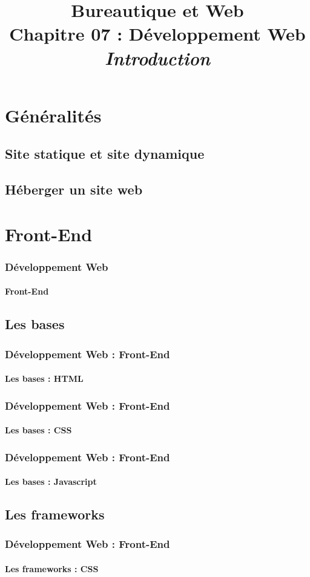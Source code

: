 \documentclass[xcolor=table]{beamer}
\title[BWEB : 08- Web (HTML)] %
{Bureautique et Web \\Chapitre 07 : Développement Web\\ \slshape\small  Introduction}
\begin{document}
	
\section{Généralités}

\subsection{Site statique et site dynamique}

\subsection{Héberger un site web}



\section{Front-End}

\begin{frame}
\frametitle{Développement Web}
\framesubtitle{Front-End}


\end{frame}

\subsection{Les bases}

\begin{frame}
\frametitle{Développement Web : Front-End}
\framesubtitle{Les bases : HTML}

\end{frame}

\begin{frame}
\frametitle{Développement Web : Front-End}
\framesubtitle{Les bases : CSS}

\end{frame}

\begin{frame}
\frametitle{Développement Web : Front-End}
\framesubtitle{Les bases : Javascript}

\end{frame}

\subsection{Les frameworks}

\begin{frame}
\frametitle{Développement Web : Front-End}
\framesubtitle{Les frameworks : CSS}

\end{frame}
\end{document}
